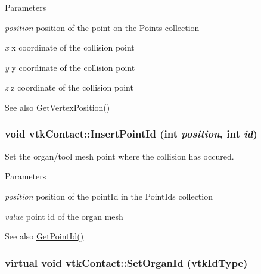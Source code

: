 \begin{DoxyParams}{Parameters}
\item[{\em position}]position of the point on the Points collection \item[{\em x}]x coordinate of the collision point \item[{\em y}]y coordinate of the collision point \item[{\em z}]z coordinate of the collision point \end{DoxyParams}
\begin{DoxySeeAlso}{See also}
GetVertexPosition() 
\end{DoxySeeAlso}
\hypertarget{classvtkContact_adf2fd8546c9ca9f06e25f319bb6f82ac}{
\subsubsection[{InsertPointId}]{\setlength{\rightskip}{0pt plus 5cm}void vtkContact::InsertPointId (int {\em position}, \/  int {\em id})}}
\label{classvtkContact_adf2fd8546c9ca9f06e25f319bb6f82ac}


Set the organ/tool mesh point where the collision has occured. 


\begin{DoxyParams}{Parameters}
\item[{\em position}]position of the pointId in the PointIds collection \item[{\em value}]point id of the organ mesh \end{DoxyParams}
\begin{DoxySeeAlso}{See also}
\hyperlink{classvtkContact_a4b404cb999cbe287f2ea6c386e34d0fd}{GetPointId()} 
\end{DoxySeeAlso}
\hypertarget{classvtkContact_afae2207fe8a86b5d8855042f1dbd345c}{
\subsubsection[{SetOrganId}]{\setlength{\rightskip}{0pt plus 5cm}virtual void vtkContact::SetOrganId (vtkIdType)}}
\label{classvtkContact_afae2207fe8a86b5d8855042f1dbd345c}



